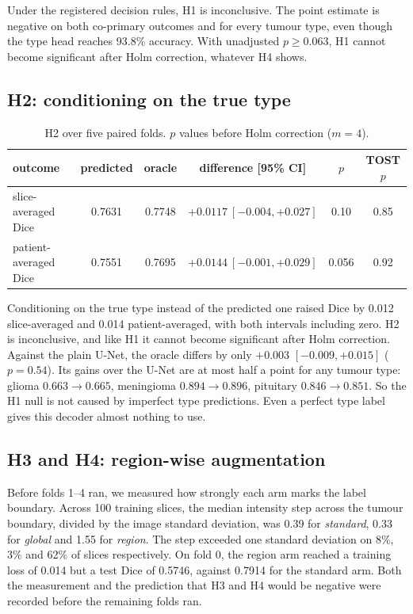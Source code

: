 \documentclass[11pt,a4paper]{article}
\begin{document}
Under the registered decision rules, H1 is inconclusive. The point estimate is
negative on both co-primary outcomes and for every tumour type, even though the
type head reaches 93.8\% accuracy. With unadjusted $p\ge0.063$, H1 cannot become
significant after Holm correction, whatever H4 shows.

\subsection{H2: conditioning on the true type}
\begin{table}[H]
\centering\small
\begin{tabular}{@{}lccccc@{}}
\toprule
outcome & predicted & oracle & difference [95\% CI] & $p$ & TOST $p$\\
\midrule
slice-averaged Dice & 0.7631 & 0.7748 & $+0.0117\ [-0.004,+0.027]$ & 0.10 & 0.85\\
patient-averaged Dice & 0.7551 & 0.7695 & $+0.0144\ [-0.001,+0.029]$ & 0.056 & 0.92\\
\bottomrule
\end{tabular}
\caption{H2 over five paired folds. $p$ values before Holm correction ($m=4$).}
\end{table}

Conditioning on the true type instead of the predicted one raised Dice by 0.012
slice-averaged and 0.014 patient-averaged, with both intervals including zero.
H2 is inconclusive, and like H1 it cannot become significant after Holm
correction. Against the plain U-Net, the oracle differs by only $+0.003$
$[-0.009,+0.015]$ ($p=0.54$). Its gains over the U-Net are at most half a point
for any tumour type: glioma $0.663\to0.665$, meningioma $0.894\to0.896$,
pituitary $0.846\to0.851$. So the H1 null is not caused by imperfect type
predictions. Even a perfect type label gives this decoder almost nothing to use.

\subsection{H3 and H4: region-wise augmentation}
\label{sec:h3}

Before folds 1--4 ran, we measured how strongly each arm marks the label
boundary. Across 100 training slices, the median intensity step across the
tumour boundary, divided by the image standard deviation, was 0.39 for
\emph{standard}, 0.33 for \emph{global} and 1.55 for \emph{region}. The step
exceeded one standard deviation on 8\%, 3\% and 62\% of slices respectively. On
fold 0, the region arm reached a training loss of 0.014 but a test Dice of 0.5746,
against 0.7914 for the standard arm. Both the measurement and the prediction that
H3 and H4 would be negative were recorded before the remaining folds ran.
\end{document}
